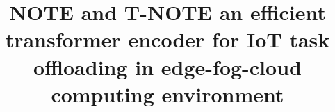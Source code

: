 \documentclass[preprint,12pt]{elsarticle}
\begin{document}
\begin{frontmatter}





\title{NOTE and T-NOTE an efficient transformer encoder for IoT task offloading in edge-fog-cloud computing environment}



\author{} %



\end{frontmatter}
\end{document}
